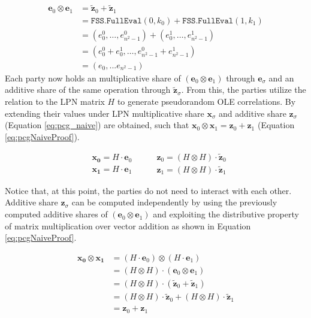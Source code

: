 \begin{equation}
\begin{aligned}
\label{eq:pcgPrimalLPNFssSecretSharing}
\mathbf{e}_0 \otimes \mathbf{e}_1 &= \mathbf{\tilde{z}}_0 + \mathbf{\tilde{z}}_1 \\
&= \texttt{FSS.FullEval}(0, k_0) + \texttt{FSS.FullEval}(1, k_1) \\
&= (e_{0}^0, \ldots, e_{n^2-1}^0) + (e_{0}^1, \ldots, e_{n^2-1}^1) \\
&= (e_{0}^0+e_{0}^1, \ldots, e_{n^2-1}^0+e_{n^2-1}^1) \\
&= (e_0, ... e_{n^2-1})
\end{aligned}
\end{equation}
Each party now holds an multiplicative share of $(\mathbf{e}_0 \otimes \mathbf{e}_1)$ through $\mathbf{e}_\sigma$ and an additive share of the same operation through $\mathbf{\tilde{z}}_\sigma$. From this, the parties utilize the relation to the LPN matrix $H$ to generate pseudorandom OLE correlations. By extending their values under LPN multiplicative share  $\mathbf{x}_\sigma$ and additive share $\mathbf{z}_\sigma$ (Equation \ref{eq:pcg_naive}) are obtained, such that  $\mathbf{x}_0 \otimes\mathbf{x}_1 = \mathbf{z}_0 + \mathbf{z}_1 $ (Equation \ref{eq:pcgNaiveProof}). 

\begin{equation}
\begin{aligned}
& \mathbf{x_0} = H\cdot \mathbf{e}_0 \\
& \mathbf{x_1} = H\cdot \mathbf{e}_1
\end{aligned}
\:\:\:\:\:\: 
\begin{aligned}
&\mathbf{z}_0 = (H\otimes H) \cdot \mathbf{\tilde{z}}_0 \\
& \mathbf{z}_1 = (H\otimes H) \cdot \mathbf{\tilde{z}}_1
\end{aligned}
\label{eq:pcg_naive}
\end{equation}

Notice that, at this point, the parties do not need to interact with each other. Additive share $\mathbf{z}_\sigma$ can be computed independently by using the previously computed additive shares of  $(\mathbf{e}_0 \otimes \mathbf{e}_1)$ and exploiting the distributive property of matrix multiplication over vector addition as shown in Equation \ref{eq:pcgNaiveProof}.

\begin{equation}    
\begin{aligned}
\mathbf{x_0} \otimes \mathbf{x_1} &= (H\cdot \mathbf{e}_0)\otimes(H\cdot \mathbf{e}_1)\\ 
&= (H\otimes H)\cdot (\mathbf{e}_0 \otimes \mathbf{e}_1)\\
&=(H\otimes H)\cdot (\mathbf{\tilde{z}}_0 + \mathbf{\tilde{z}}_1) \\
&=(H\otimes H)\cdot \mathbf{\tilde{z}}_0 + (H\otimes H)\cdot \mathbf{\tilde{z}}_1 \\
&= \mathbf{z}_0 + \mathbf{z}_1 
\label{eq:pcgNaiveProof}
\end{aligned}
\end{equation}



